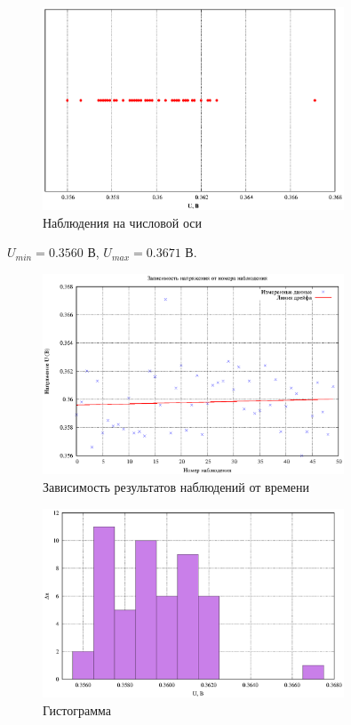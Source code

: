 \begin{figure}[ht!]
\centering
\includegraphics[width=0.8\textwidth]{voltage_i.eps}
\caption{Наблюдения на числовой оси}
\label{fig:plot1}
\end{figure}
$U_{min} = 0.3560$ В, $U_{max} = 0.3671$ В.
\begin{figure}[ht!]
\centering
\includegraphics[width=0.8\textwidth]{voltage_drift.eps}
\caption{Зависимость результатов наблюдений от времени}
\label{fig:plot}
\end{figure}

\begin{figure}[ht!]
\centering
\includegraphics[width=0.8\textwidth]{histogramma.eps}
\caption{Гистограмма}
\label{fig:plot2}
\end{figure}

